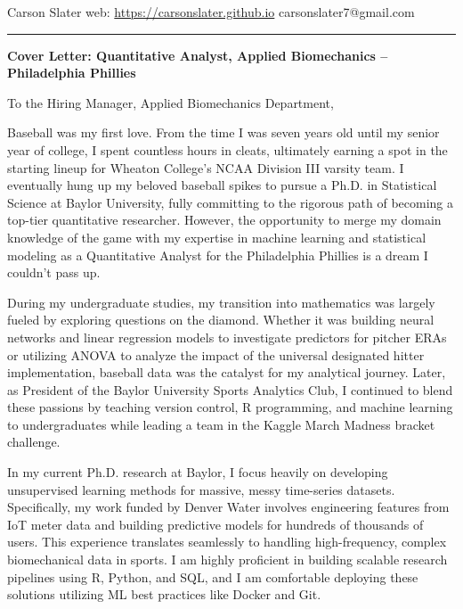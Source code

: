 \documentclass[11pt]{article}
\begin{document}
\noindent
Carson Slater \hfill web: \href{https://carsonslater.github.io}{https://carsonslater.github.io} \hfill carsonslater7@gmail.com \\
\rule{\textwidth}{0.4pt}

\vspace{2em}

\begin{center}
    \Large \textbf{Cover Letter: Quantitative Analyst, Applied Biomechanics -- Philadelphia Phillies}
\end{center}

\vspace{1em}

\noindent
To the Hiring Manager, Applied Biomechanics Department,

\vspace{1em}

Baseball was my first love. From the time I was seven years old until my senior year of college, I spent countless hours in cleats, ultimately earning a spot in the starting lineup for Wheaton College's NCAA Division III varsity team. I eventually hung up my beloved baseball spikes to pursue a Ph.D. in Statistical Science at Baylor University, fully committing to the rigorous path of becoming a top-tier quantitative researcher. However, the opportunity to merge my domain knowledge of the game with my expertise in machine learning and statistical modeling as a Quantitative Analyst for the Philadelphia Phillies is a dream I couldn't pass up.

During my undergraduate studies, my transition into mathematics was largely fueled by exploring questions on the diamond. Whether it was building neural networks and linear regression models to investigate predictors for pitcher ERAs or utilizing ANOVA to analyze the impact of the universal designated hitter implementation, baseball data was the catalyst for my analytical journey. Later, as President of the Baylor University Sports Analytics Club, I continued to blend these passions by teaching version control, R programming, and machine learning to undergraduates while leading a team in the Kaggle March Madness bracket challenge.

In my current Ph.D. research at Baylor, I focus heavily on developing unsupervised learning methods for massive, messy time-series datasets. Specifically, my work funded by Denver Water involves engineering features from IoT meter data and building predictive models for hundreds of thousands of users. This experience translates seamlessly to handling high-frequency, complex biomechanical data in sports. I am highly proficient in building scalable research pipelines using R, Python, and SQL, and I am comfortable deploying these solutions utilizing ML best practices like Docker and Git.
\end{document}
